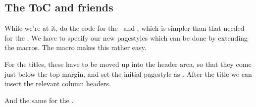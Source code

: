 \subsection{The ToC and friends}

    While we're at it, do the code for the \lof\ and \lot, which is simpler
than that needed for the \toc. We have to specify our new pagestyles which
can be done by extending the  macros. The \cmd{\addtodef}
macro makes this rather easy.
\begin{lcode}
\renewcommand{\listfigurename}{LIST OF FIGURES}
\addtodef{\listoffigures}{\clearpage\pagestyle{lof}}{}
\end{lcode}
For the titles, these have to be moved up into the header area, so that
they come just below the top margin, and set the initial pagestyle as 
. After the title we can insert the relevant column headers.
\begin{lcode}
\renewcommand*{\lofheadstart}{\vspace*{-\topfiddle}}
\renewcommand*{\afterloftitle}{\thispagestyle{plain}%
  \par\nobreak {\normalfont Figure \hfill Page}\par\nobreak}

\end{lcode}
And the same for the \lot.
\begin{lcode}
\renewcommand{\listtablename}{LIST OF TABLES}
\addtodef{\listoftables}{\clearpage\pagestyle{lot}}{}
\renewcommand*{\lotheadstart}{\vspace*{-\topfiddle}}
\renewcommand*{\afterlottitle}{\thispagestyle{plain}%
  \par\nobreak {\normalfont Table \hfill Page}\par\nobreak}

\end{lcode}

